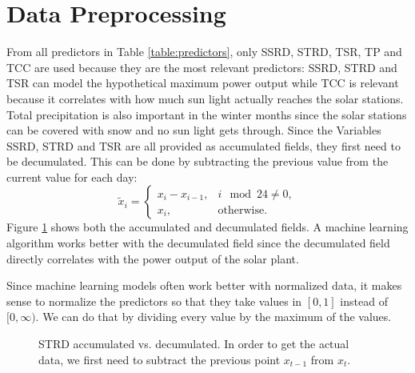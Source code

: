 \section{Data Preprocessing}
\label{sec:data-preprocessing}

From all predictors in Table \ref{table:predictors}, only SSRD, STRD, TSR, TP and TCC are used 
because they are the most relevant predictors: SSRD, STRD and TSR can model the hypothetical maximum power 
output while TCC is relevant because it correlates with how much sun light actually reaches the solar stations. 
Total precipitation is also important in the winter months since the solar stations can be covered with snow and no sun light gets through.
Since the Variables SSRD, STRD and TSR are all provided as accumulated fields, they first need to be decumulated.
This can be done by subtracting the previous value from the current value for each day: 
\[ \tilde{x}_i = \begin{cases}
    x_i - x_{i-1}, &i \mod 24 \neq 0, \\
    x_i, &\text{otherwise}.
\end{cases} \]
Figure \ref{fig:strd-accumulated-vs-decumulated} shows both the accumulated and decumulated fields. 
A machine learning algorithm works better with the decumulated field since the decumulated field directly correlates 
with the power output of the solar plant.

Since machine learning models often work better with normalized data, it makes sense to normalize the predictors 
so that they take values in \([0,1]\) instead of \([0,\infty)\). We can do that by dividing every value by the maximum of the values. 

\begin{figure}[h]%
    \centering
    \qquad
    \caption[STRD accumulated vs. decumulated]{STRD accumulated vs. decumulated. 
    In order to get the actual data, we first need to subtract the previous point \(x_{t-1}\) from \(x_t\).}%
    \label{fig:strd-accumulated-vs-decumulated}%
\end{figure}